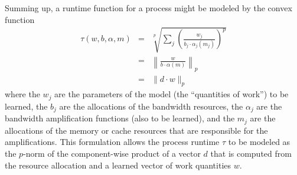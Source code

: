 Summing up, a runtime function for a process might be modeled by the convex function
\begin{eqnarray*}
\tau(w,b,\alpha,m) &=& \sqrt[p]{\sum_j \left(\frac{w_j}{b_j\cdot\alpha_j(m_j)}\right)^p}  \\
                   &=& \left\|\frac{w}{b \cdot \alpha(m)}\right\|_p \\
                   &=& \|d \cdot w \|_p
\end{eqnarray*}
where the $w_j$ are the parameters of the model (the “quantities of work”) to be learned,
the $b_j$  are the allocations of the bandwidth resources,
the $\alpha_j$ are the bandwidth amplification functions (also to be learned),
and the $m_j$ are the allocations of the memory or cache resources that are responsible for the amplifications.
This formulation allows the process runtime $\tau$ to be modeled as the $p$-norm of
the component-wise product of a vector $d$ that is computed from the resource allocation
and a learned vector of work quantities $w$.
